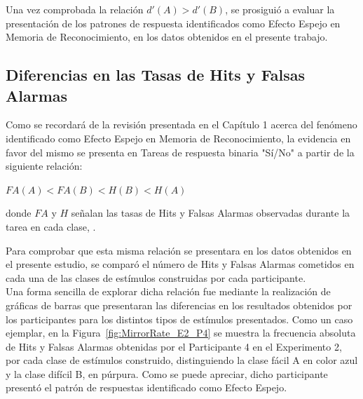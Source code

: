 Una vez comprobada la relación $d'(A) > d'(B)$, se prosiguió a evaluar la presentación de los patrones de respuesta identificados como Efecto Espejo en Memoria de Reconocimiento, en los datos obtenidos en el presente trabajo.\\












\subsection{Diferencias en las Tasas de Hits y Falsas Alarmas}

Como se recordará de la revisión presentada en el Capítulo 1 acerca del fenómeno identificado como Efecto Espejo en Memoria de Reconocimiento, la evidencia en favor del mismo se presenta en Tareas de respuesta binaria "Sí/No" a partir de la siguiente relación:\\
 
\begin{center}
$FA(A) < FA(B) < H(B) < H(A)$\\
\end{center}
\begin{center}
donde $FA$ y $H$ señalan las tasas de Hits y Falsas Alarmas observadas durante la tarea en cada clase, \parencite{Glanzer1993}.\\
\end{center}

Para comprobar que esta misma relación se presentara en los datos obtenidos en el presente estudio, se comparó el número de Hits y Falsas Alarmas cometidos en cada una de las clases de estímulos construidas por cada participante.\\

Una forma sencilla de explorar dicha relación fue mediante la realización de gráficas de barras que presentaran las diferencias en los resultados obtenidos por los participantes para los distintos tipos de estímulos presentados. Como un caso ejemplar, en la Figura~\ref{fig:MirrorRate_E2_P4} se muestra la frecuencia absoluta de Hits y Falsas Alarmas obtenidas por el Participante 4 en el Experimento 2, por cada clase de estímulos construido, distinguiendo la clase fácil A en color azul y la clase difícil B, en púrpura. Como se puede apreciar, dicho participante presentó el patrón de respuestas identificado como Efecto Espejo.\\

